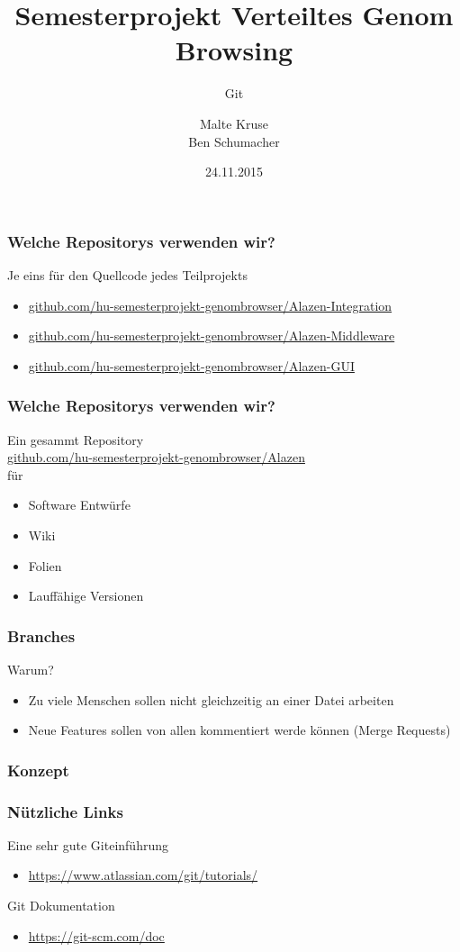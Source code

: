 \documentclass{beamer}
\title[VGB]{Semesterprojekt Verteiltes Genom Browsing}
\subtitle{Git}
\author[Kruse,Schumacher]{Malte Kruse\\Ben Schumacher}
\institute{Institut für Informatik\\Humboldt-Universität zu Berlin}
\date{24.11.2015}
\begin{document}
\begin{frame}
	\titlepage
\end{frame}


\begin{frame}
	\frametitle{Welche Repositorys verwenden wir?}
	Je eins für den Quellcode jedes Teilprojekts
	\begin{itemize}
		\item \url{github.com/hu-semesterprojekt-genombrowser/Alazen-Integration}
		\item \url{github.com/hu-semesterprojekt-genombrowser/Alazen-Middleware}
		\item \url{github.com/hu-semesterprojekt-genombrowser/Alazen-GUI}
	\end{itemize}
\end{frame}

\begin{frame}
	\frametitle{Welche Repositorys verwenden wir?}
	Ein gesammt Repository\\
	\url{github.com/hu-semesterprojekt-genombrowser/Alazen}\\
	für
	\begin{itemize}[<+->]
		\item Software Entwürfe
		\item Wiki
		\item Folien
		\item Lauffähige Versionen
	\end{itemize}
\end{frame}

\begin{frame}
	\frametitle{Branches}
	Warum?
	\begin{itemize}
		\item Zu viele Menschen sollen nicht gleichzeitig an einer Datei arbeiten
		\item Neue Features sollen von allen kommentiert werde können (Merge Requests)
	\end{itemize}
\end{frame}

\begin{frame}
	\frametitle{Konzept}
	\begin{figure}
	    \centering
	    \def\svgwidth{0.8\columnwidth}
	    
	\end{figure}
\end{frame}


\begin{frame}
	\frametitle{Nützliche Links}
	Eine sehr gute Giteinführung
	\begin{itemize}
		\item \url{https://www.atlassian.com/git/tutorials/}
	\end{itemize}
	Git Dokumentation
	\begin{itemize}
		\item \url{https://git-scm.com/doc}
	\end{itemize}
\end{frame}
\end{document}
